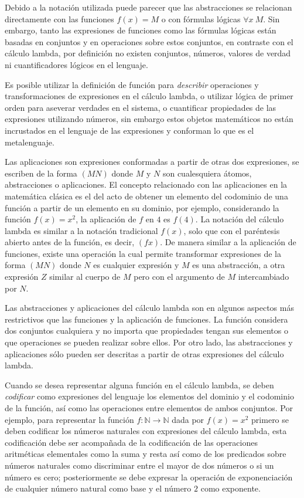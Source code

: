 Debido a la notación utilizada puede parecer que las abstracciones se relacionan directamente con las funciones \( f(x)=M \) o con fórmulas lógicas \( \forall x\ M \). Sin embargo, tanto las expresiones de funciones como las fórmulas lógicas están basadas en conjuntos y en operaciones sobre estos conjuntos, en contraste con el cálculo lambda, por definición no existen conjuntos, números, valores de verdad ni cuantificadores lógicos en el lenguaje.

Es posible utilizar la definición de función para \emph{describir} operaciones y transformaciones de expresiones en el cálculo lambda, o utilizar lógica de primer orden para aseverar verdades en el sistema, o cuantificar propiedades de las expresiones utilizando números, sin embargo estos objetos matemáticos no están incrustados en el lenguaje de las expresiones y conforman lo que es el metalenguaje.

Las aplicaciones son expresiones conformadas a partir de otras dos expresiones, se escriben de la forma \( (M N) \) donde \( M \) y \( N \) son cualesquiera átomos, abstracciones o aplicaciones. El concepto relacionado con las aplicaciones en la matemática clásica es el del acto de obtener un elemento del codominio de una función a partir de un elemento en su dominio, por ejemplo, considerando la función \( f(x)=x^{2} \), la aplicación de \( f \) en \( 4 \) es \( f(4) \).  La notación del cálculo lambda es similar a la notación tradicional \( f(x) \), solo que con el paréntesis abierto antes de la función, es decir, \( (f x) \). De manera similar a la aplicación de funciones, existe una operación la cual permite transformar expresiones de la forma \( (M N) \) donde \( N \) es cualquier expresión y \( M \) es una abstracción, a otra expresión \( Z \) similar al cuerpo de \( M \) pero con el argumento de \( M \) intercambiado por \( N \).

Las abstracciones y aplicaciones del cálculo lambda son en algunos aspectos más restrictivos que las funciones y la aplicación de funciones. La función considera dos conjuntos cualquiera y no importa que propiedades tengan sus elementos o que operaciones se pueden realizar sobre ellos. Por otro lado, las abstracciones y aplicaciones sólo pueden ser descritas a partir de otras expresiones del cálculo lambda.

Cuando se desea representar alguna función en el cálculo lambda, se deben \emph{codificar} como expresiones del lenguaje los elementos del dominio y el codominio de la función, así como las operaciones entre elementos de ambos conjuntos. Por ejemplo, para representar la función \( f \colon \mathbb{N} \to \mathbb{N} \) dada por \( f(x)=x^{2} \) primero se deben codificar los números naturales con expresiones del cálculo lambda, esta codificación debe ser acompañada de la codificación de las operaciones aritméticas elementales como la suma y resta así como de los predicados sobre números naturales como discriminar entre el mayor de dos números o si un número es cero; posteriormente se debe expresar la operación de exponenciación de cualquier número natural como base y el número \( 2 \) como exponente.

